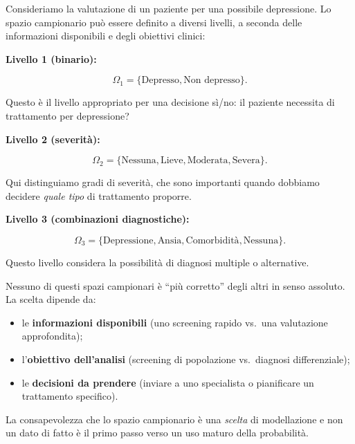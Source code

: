 \documentclass[
  italian,
  letterpaper,
  a4paper,
  11pt,
  open=any]{scrbook}
\providecommand{\tightlist}{%
  \setlength{\itemsep}{0pt}\setlength{\parskip}{0pt}}
\theoremstyle{plain}
\theoremstyle{definition}
\theoremstyle{definition}
\theoremstyle{remark}
\begin{document}
\begin{tcolorbox}[enhanced jigsaw, arc=.35mm, bottomrule=.15mm, bottomtitle=1mm, breakable, colback=white, colbacktitle=quarto-callout-note-color!10!white, colframe=quarto-callout-note-color-frame, coltitle=black, left=2mm, leftrule=.75mm, opacityback=0, opacitybacktitle=0.6, rightrule=.15mm, title=\textcolor{quarto-callout-note-color}{\faInfo}\hspace{0.5em}{Esempio psicologico: livelli di granularità nella valutazione clinica}, titlerule=0mm, toprule=.15mm, toptitle=1mm]

Consideriamo la valutazione di un paziente per una possibile
depressione. Lo spazio campionario può essere definito a diversi
livelli, a seconda delle informazioni disponibili e degli obiettivi
clinici:

\textbf{Livello 1 (binario):}

\[\Omega_1 = \{\text{Depresso}, \text{Non depresso}\}.\]

Questo è il livello appropriato per una decisione sì/no: il paziente
necessita di trattamento per depressione?

\textbf{Livello 2 (severità):}

\[\Omega_2 = \{\text{Nessuna}, \text{Lieve}, \text{Moderata}, \text{Severa}\}.\]

Qui distinguiamo gradi di severità, che sono importanti quando dobbiamo
decidere \emph{quale tipo} di trattamento proporre.

\textbf{Livello 3 (combinazioni diagnostiche):}

\[\Omega_3 = \{\text{Depressione}, \text{Ansia}, \text{Comorbidità}, \text{Nessuna}\}.\]

Questo livello considera la possibilità di diagnosi multiple o
alternative.

Nessuno di questi spazi campionari è ``più corretto'' degli altri in
senso assoluto. La scelta dipende da:

\begin{itemize}
\tightlist
\item
  le \textbf{informazioni disponibili} (uno screening rapido vs.~una
  valutazione approfondita);
\item
  l'\textbf{obiettivo dell'analisi} (screening di popolazione
  vs.~diagnosi differenziale);
\item
  le \textbf{decisioni da prendere} (inviare a uno specialista o
  pianificare un trattamento specifico).
\end{itemize}

La consapevolezza che lo spazio campionario è una \emph{scelta} di
modellazione e non un dato di fatto è il primo passo verso un uso maturo
della probabilità.

\end{tcolorbox}
\end{document}
